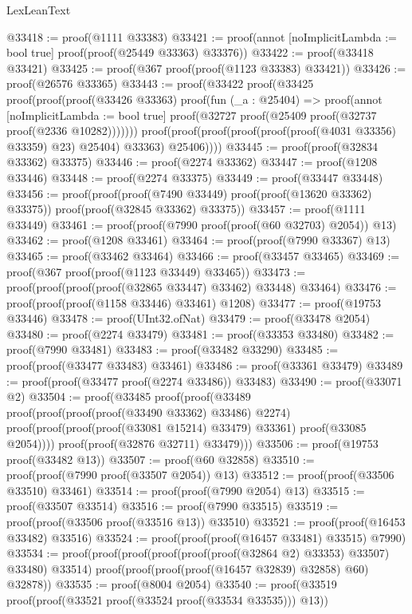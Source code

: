 \begin{lexlean}{LexLeanText}
\begin{coremodule}
@33418 := proof(@1111 @33383)
@33421 := proof(annot [noImplicitLambda := bool true] proof(proof(@25449 @33363) @33376))
@33422 := proof(@33418 @33421)
@33425 := proof(@367 proof(proof(@1123 @33383) @33421))
@33426 := proof(@26576 @33365)
@33443 := proof(@33422
      proof(@33425
          proof(proof(proof(@33426 @33363)
                proof(fun (_a : @25404) =>
                  proof(annot [noImplicitLambda := bool true]
                    proof(@32727 proof(@25409 proof(@32737 proof(@2336 @10282)))))))
              proof(proof(proof(proof(proof(proof(@4031 @33356) @33359) @23) @25404) @33363)
                  @25406))))
@33445 := proof(proof(@32834 @33362) @33375)
@33446 := proof(@2274 @33362)
@33447 := proof(@1208 @33446)
@33448 := proof(@2274 @33375)
@33449 := proof(@33447 @33448)
@33456 := proof(proof(proof(@7490 @33449) proof(proof(@13620 @33362) @33375))
      proof(proof(@32845 @33362) @33375))
@33457 := proof(@1111 @33449)
@33461 := proof(proof(@7990 proof(proof(@60 @32703) @2054)) @13)
@33462 := proof(@1208 @33461)
@33464 := proof(proof(@7990 @33367) @13)
@33465 := proof(@33462 @33464)
@33466 := proof(@33457 @33465)
@33469 := proof(@367 proof(proof(@1123 @33449) @33465))
@33473 := proof(proof(proof(proof(@32865 @33447) @33462) @33448) @33464)
@33476 := proof(proof(proof(@1158 @33446) @33461) @1208)
@33477 := proof(@19753 @33446)
@33478 := proof(UInt32.ofNat)
@33479 := proof(@33478 @2054)
@33480 := proof(@2274 @33479)
@33481 := proof(@33353 @33480)
@33482 := proof(@7990 @33481)
@33483 := proof(@33482 @33290)
@33485 := proof(proof(@33477 @33483) @33461)
@33486 := proof(@33361 @33479)
@33489 := proof(proof(@33477 proof(@2274 @33486)) @33483)
@33490 := proof(@33071 @2)
@33504 := proof(@33485
      proof(proof(@33489
            proof(proof(proof(proof(@33490 @33362) @33486) @2274)
                proof(proof(proof(proof(@33081 @15214) @33479) @33361) proof(@33085 @2054))))
          proof(proof(@32876 @32711) @33479)))
@33506 := proof(@19753 proof(@33482 @13))
@33507 := proof(@60 @32858)
@33510 := proof(proof(@7990 proof(@33507 @2054)) @13)
@33512 := proof(proof(@33506 @33510) @33461)
@33514 := proof(proof(@7990 @2054) @13)
@33515 := proof(@33507 @33514)
@33516 := proof(@7990 @33515)
@33519 := proof(proof(@33506 proof(@33516 @13)) @33510)
@33521 := proof(proof(@16453 @33482) @33516)
@33524 := proof(proof(proof(@16457 @33481) @33515) @7990)
@33534 := proof(proof(proof(proof(proof(proof(@32864 @2) @33353) @33507) @33480) @33514)
      proof(proof(proof(proof(@16457 @32839) @32858) @60) @32878))
@33535 := proof(@8004 @2054)
@33540 := proof(@33519 proof(proof(@33521 proof(@33524 proof(@33534 @33535))) @13))

\end{coremodule}
\end{lexlean}
